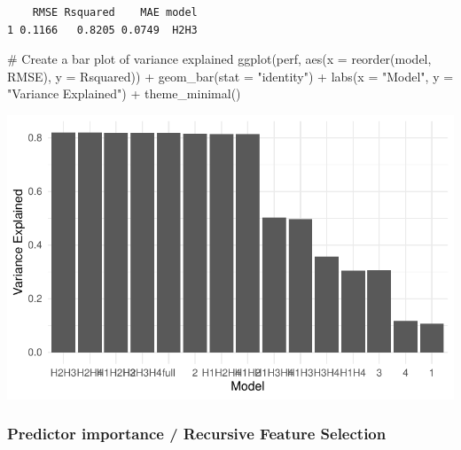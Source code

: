 \documentclass[
  letterpaper,
  DIV=11,
  numbers=noendperiod]{scrartcl}
\newenvironment{Shaded}{\begin{snugshade}}{\end{snugshade}}
\newcommand{\AttributeTok}[1]{\textcolor[rgb]{0.40,0.45,0.13}{#1}}
\newcommand{\CommentTok}[1]{\textcolor[rgb]{0.37,0.37,0.37}{#1}}
\newcommand{\FunctionTok}[1]{\textcolor[rgb]{0.28,0.35,0.67}{#1}}
\newcommand{\NormalTok}[1]{\textcolor[rgb]{0.00,0.23,0.31}{#1}}
\newcommand{\SpecialCharTok}[1]{\textcolor[rgb]{0.37,0.37,0.37}{#1}}
\newcommand{\StringTok}[1]{\textcolor[rgb]{0.13,0.47,0.30}{#1}}
\begin{document}
\begin{verbatim}
    RMSE Rsquared    MAE model
1 0.1166   0.8205 0.0749  H2H3
\end{verbatim}

\begin{Shaded}
\begin{Highlighting}[]
\CommentTok{\# Create a bar plot of variance explained}
\FunctionTok{ggplot}\NormalTok{(perf, }\FunctionTok{aes}\NormalTok{(}\AttributeTok{x =} \FunctionTok{reorder}\NormalTok{(model, RMSE), }\AttributeTok{y =}\NormalTok{ Rsquared)) }\SpecialCharTok{+}
  \FunctionTok{geom\_bar}\NormalTok{(}\AttributeTok{stat =} \StringTok{"identity"}\NormalTok{) }\SpecialCharTok{+}
  \FunctionTok{labs}\NormalTok{(}\AttributeTok{x =} \StringTok{"Model"}\NormalTok{, }\AttributeTok{y =} \StringTok{"Variance Explained"}\NormalTok{) }\SpecialCharTok{+}
  \FunctionTok{theme\_minimal}\NormalTok{()}
\end{Highlighting}
\end{Shaded}

\includegraphics{MachineLearning_StaticPatterNN_Report_files/figure-pdf/var-part-ranger-performance-eval-1.pdf}

\subsubsection{Predictor importance / Recursive Feature
Selection}\label{predictor-importance-recursive-feature-selection}
\end{document}
